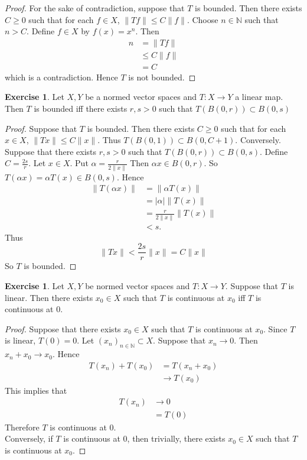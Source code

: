 \documentclass[12pt]{amsart}
\theoremstyle{definition}
\newtheorem{ex}[definition]{Exercise}
\newcommand{\al}{\alpha}
\newcommand{\N}{\mathbb{N}}
\newcommand{\lex}[1]{\label{ex:#1}}
\begin{document}
	\begin{proof}
	For the sake of contradiction, suppose that $T$ is bounded. Then there exists $C \geq 0$ such that for each $f \in X$, $\|Tf\| \leq C \|f\|$. Choose $n \in \N$ such that $n > C$. Define $f \in X$ by $f(x) = x^n$. Then
	\begin{align*}
	n
	&= \|Tf\| \\
	&\leq C \|f\| \\
	&= C
\end{align*}		
	which is a contradiction. Hence $T$ is not bounded.
	\end{proof}
	
	\begin{ex} \lex{42003}
		Let $X,Y$ be a normed vector spaces and $T:X \rightarrow Y$ a linear map. Then $T$ is bounded iff there exists $r,s>0$ such that $T(B(0,r)) \subset B(0,s)$
	\end{ex}
	
	\begin{proof}
		Suppose that $T$ is bounded. Then there exists $C \geq 0$ such that for each $x \in X$, $\|Tx \|\leq C \|x \|$. Thus $T(B(0,1)) \subset B(0,C+1)$. Conversely. Suppose that there exists $r,s >0$ such that $T(B(0,r)) \subset B(0,s)$. Define $C = \frac{2s}{r}$. Let $x \in X$. Put $\al = \frac{r}{2\|x \|}$ Then $\al x \in B(0,r)$. So $T(\al x ) = \al T(x) \in B(0,s)$. Hence 
		\begin{align*}
			\|T(\al x) \|
			&= \|\al T(x) \|\\
			&= \vert \al \vert \|T(x) \|\\
			& = \frac{r}{2 \|x \|}  \|T(x) \|\\
			& < s.
		\end{align*}
		Thus $$\|Tx \|< \frac{2 s}{r} \|x \|= C \|x \|$$ So $T$ is bounded. 
	\end{proof}
	
	\begin{ex} \lex{42003.1}
	Let $X, Y$ be normed vector spaces and $T:X \rightarrow Y$. Suppose that $T$ is linear. Then there exists $x_0 \in X$ such that $T$ is continuous at $x_0$ iff $T$ is continuous at 0.
	\end{ex}
	
	\begin{proof}
	Suppose that there exists $x_0 \in X$ such that $T$ is continuous at $x_0$. Since $T$ is linear, $T(0) = 0$. Let $(x_n)_{n \in \N} \subset X$. Suppose that $x_n \rightarrow 0$. Then $x_n + x_0 \rightarrow x_0$. Hence 
	\begin{align*}
	T(x_n) + T(x_0)
	&= T(x_n + x_0) \\
	& \rightarrow T(x_0)
	\end{align*}	  
	This implies that 
	\begin{align*}
	T(x_n) 
	&\rightarrow 0 \\
	& = T(0)
	\end{align*}	 
	Therefore $T$ is continuous at $0$. \\
	Conversely, if $T$ is continuous at $0$, then trivially, there exists $x_0 \in X$ such that $T$ is continuous at $x_0$.
	\end{proof}
	
\end{document}
